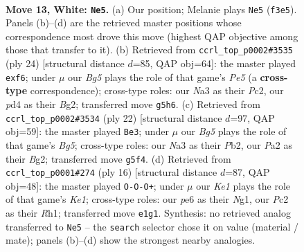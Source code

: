 \documentclass[11pt]{article}
\begin{document}
\clearpage

\begin{figure}[p]\centering
\begin{subfigure}{0.46\textwidth}\centering
\resizebox{\linewidth}{!}{%
\newchessgame
\chessboard[
  setfen={rn1k1bnr/pp5p/4pp2/1B1p1bB1/3p4/N4N2/P1P2PPP/2R1K2R w K - 0 13},
  showmover=false,
  pgfstyle=straightmove, color=movearrow, markmove={f3-e5}
]}
\caption{}
\end{subfigure}\hfill
\begin{subfigure}{0.46\textwidth}\centering
\resizebox{\linewidth}{!}{%
\newchessgame
\chessboard[
  setfen={rnbr2k1/pp4bp/2p2pp1/4P1Bn/8/2N2NP1/PPP3BP/R3K2R w KQ - 0 13},
  showmover=false,
  pgfstyle=straightmove, color=movearrow, markmove={e5-f6}
]}
\caption{}
\end{subfigure}
\\[4pt]
\begin{subfigure}{0.46\textwidth}\centering
\resizebox{\linewidth}{!}{%
\newchessgame
\chessboard[
  setfen={rnbrn1k1/ppp3bp/5pp1/6B1/4P3/2N2NP1/PPP3BP/R3K2R w KQ - 0 12},
  showmover=false,
  pgfstyle=straightmove, color=movearrow, markmove={g5-e3}
]}
\caption{}
\end{subfigure}\hfill
\begin{subfigure}{0.46\textwidth}\centering
\resizebox{\linewidth}{!}{%
\newchessgame
\chessboard[
  setfen={rn1k1b1r/1p3ppp/p3bn2/2p1p3/5B2/2N5/PPP2PPP/R3KBNR w KQ - 0 9},
  showmover=false,
  pgfstyle=straightmove, color=movearrow, markmove={e1-c1}
]}
\caption{}
\end{subfigure}
\caption{\textbf{Move 13, White: \texttt{Ne5}.} (a) Our position; Melanie plays \texttt{Ne5} (\texttt{f3e5}). Panels (b)--(d) are the retrieved master positions whose correspondence most drove this move (highest QAP objective among those that transfer to it). (b) Retrieved from \texttt{ccrl\_top\_p0002\#3535} (ply 24) [structural distance $d$=85, QAP obj=64]: the master played \texttt{exf6}; under $\mu$ our \emph{Bg5} plays the role of that game's \emph{Pe5} (a \textbf{cross-type} correspondence); cross-type roles: our \emph{N}a3 as their \emph{P}c2, our \emph{p}d4 as their \emph{B}g2; transferred move \texttt{g5h6}. (c) Retrieved from \texttt{ccrl\_top\_p0002\#3534} (ply 22) [structural distance $d$=97, QAP obj=59]: the master played \texttt{Be3}; under $\mu$ our \emph{Bg5} plays the role of that game's \emph{Bg5}; cross-type roles: our \emph{N}a3 as their \emph{P}b2, our \emph{P}a2 as their \emph{B}g2; transferred move \texttt{g5f4}. (d) Retrieved from \texttt{ccrl\_top\_p0001\#274} (ply 16) [structural distance $d$=87, QAP obj=48]: the master played \texttt{O-O-O+}; under $\mu$ our \emph{Ke1} plays the role of that game's \emph{Ke1}; cross-type roles: our \emph{p}e6 as their \emph{N}g1, our \emph{P}c2 as their \emph{R}h1; transferred move \texttt{e1g1}. Synthesis: no retrieved analog transferred to \texttt{Ne5} -- the \texttt{search} selector chose it on value (material / mate); panels (b)--(d) show the strongest nearby analogies.}
\label{fig:thought-m24}
\end{figure}
\end{document}
